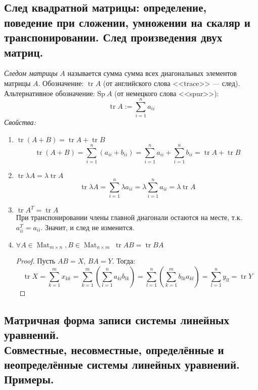 \documentclass[a4paper, 12pt]{article}
\DeclareMathOperator{\Mat}{Mat}
\DeclareMathOperator{\Tr}{tr}
\begin{document}
\subsection{След квадратной матрицы: определение, поведение при сложении, умножении на скаляр и транспонировании. След произведения двух матриц.}
\textit{Следом матрицы} $A$ называется сумма сумма всех диагональных элементов матрицы $A$. Обозначение: $\Tr A$ (от английского слова <<trace>> --- след). Альтернативное обозначение: $\mathrm{Sp}\ A$ (от немецкого слова <<spur>>): 
\[\Tr A \mathrel{:=} \sum_{i=1}^{n} a_{ii}\]
\textit{Свойства:}
\begin{enumerate}
\item $\Tr (A+B) = \Tr A + \Tr B$
\[\Tr (A + B) = \sum_{i=1}^{n} (a_{ii} + b_{ii}) = \sum_{i=1}^{n} a_{ii} + \sum_{i=1}^{n} b_{ii} = \Tr A + \Tr B\]

\item $\Tr \lambda A = \lambda \Tr A$
\[\Tr \lambda A = \sum_{i=1}^{n} \lambda a_{ii} = \lambda \sum_{i=1}^{n} a_{ii} = \lambda \Tr A\]

\item $\Tr A^T = \Tr A$\\
При транспонировании члены главной диагонали остаются на месте, т.к. $a_{ii}^T = a_{ii}$. Значит, и след не изменится.

\item $\forall A \in \Mat_{m \times n}, B \in \Mat_{n \times m}\; \Tr AB= \Tr BA$
\begin{proof}
Пусть $AB = X$, $BA = Y$. Тогда:
\[\Tr X = \sum_{k=1}^{m} x_{kk} = \sum_{k=1}^{m}\left(\sum_{l=1}^{n} a_{kl}b_{lk}\right) = \sum_{l=1}^{n}\left(\sum_{k=1}^{m} b_{lk} a_{kl}\right) = \sum_{l=1}^{n} y_{ll} = \Tr Y\]
\end{proof}
\end{enumerate}

\subsection{Матричная форма записи системы линейных уравнений.\\ Совместные, несовместные, определённые и неопределённые системы линейных уравнений. Примеры.}
\end{document}

